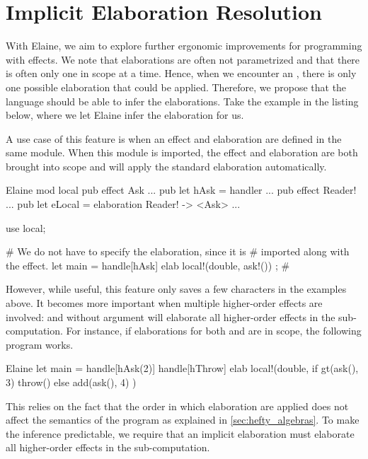 \chapter{Implicit Elaboration Resolution}\label{chap:elabres}

With Elaine, we aim to explore further ergonomic improvements for programming with effects. We note that elaborations are often not parametrized and that there is often only one in scope at a time. Hence, when we encounter an , there is only one possible elaboration that could be applied. Therefore, we propose that the language should be able to infer the elaborations. Take the example in the listing below, where we let Elaine infer the elaboration for us.


A use case of this feature is when an effect and elaboration are defined in the same module. When this module is imported, the effect and elaboration are both brought into scope and  will apply the standard elaboration automatically.

\begin{lst}{Elaine}
mod local {
    pub effect Ask { ... }
    pub let hAsk = handler { ... }
    pub effect Reader! { ... }
    pub let eLocal = elaboration Reader! -> <Ask> { ... }
}

use local;

# We do not have to specify the elaboration, since it is
# imported along with the effect.
let main = handle[hAsk] elab { local!(double, ask!()) };
#                          ^^^
\end{lst}

However, while useful, this feature only saves a few characters in the examples above. It becomes more important when multiple higher-order effects are involved: and  without argument will elaborate all higher-order effects in the sub-computation. For instance, if elaborations for both  and  are in scope, the following program works.

\begin{lst}{Elaine}
let main = handle[hAsk(2)] handle[hThrow] elab {
    local!(double, {
        if gt(ask(), 3) {
            throw() 
        } else {
            add(ask(), 4)
        }
    })
}
\end{lst}

This relies on the fact that the order in which elaboration are applied does not affect the semantics of the program as explained in \cref{sec:hefty_algebras}. To make the inference predictable, we require that an implicit elaboration must elaborate all higher-order effects in the sub-computation.

